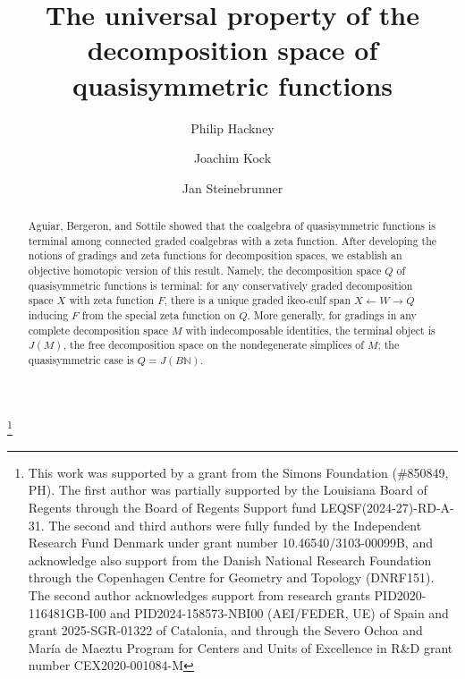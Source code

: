 \documentclass{amsart}
\theoremstyle{definition}
\theoremstyle{noname}
\begin{document}
\title[Universal property of quasisymmetric functions]{The universal property of the decomposition space of quasisymmetric functions}

\author{Philip Hackney}
\address{Department of Mathematics, University of Louisiana at Lafayette, USA}

\author{Joachim Kock}
\address{Departament de Matem\`atiques, Universitat Aut\`onoma de Barcelona, Spain and Centre de Recerca Matem\`atica (Barcelona), Spain}

\author{Jan Steinebrunner}
\address{University of Oxford, UK}

\thanks{ This work was supported by a grant from the Simons Foundation
(\#850849, PH). The first author was partially supported by the Louisiana
Board of Regents through the Board of Regents Support fund
LEQSF(2024-27)-RD-A-31. The second and third authors were fully funded by 
the Independent Research Fund Denmark under grant number 
10.46540/3103-00099B,
and acknowledge also support from the Danish National Research
Foundation through the Copenhagen Centre for Geometry and Topology (DNRF151).
The second author acknowledges support from research grants PID2020-116481GB-I00
and PID2024-158573-NBI00
(AEI/FEDER, UE) of Spain and grant 2025-SGR-01322 of Catalonia, and through the
Severo Ochoa and Mar\'ia de Maeztu Program for Centers and Units of Excellence in
R\&D grant number CEX2020-001084-M }

\begin{abstract}
Aguiar, Bergeron, and Sottile showed that the coalgebra of quasi\-symmetric functions is terminal among connected graded coalgebras with a zeta function.
After developing the notions of gradings and zeta functions for decomposition spaces, we establish an objective homotopic version of this result. 
Namely, the decomposition space $Q$ of quasisymmetric functions is terminal: for any conservatively graded decomposition space $X$ with zeta function $F$, there is a unique graded ikeo-culf span $X \leftarrow W \rightarrow Q$ inducing $F$ from the special zeta function on $Q$.
More generally, for gradings in
any complete decomposition space $M$ with indecomposable identities, the terminal object is $J(M)$, the free decomposition space on the nondegenerate simplices of $M$; the quasisymmetric case is $Q=J(B\mathbb{N})$.
\end{abstract}

\maketitle
\end{document}
